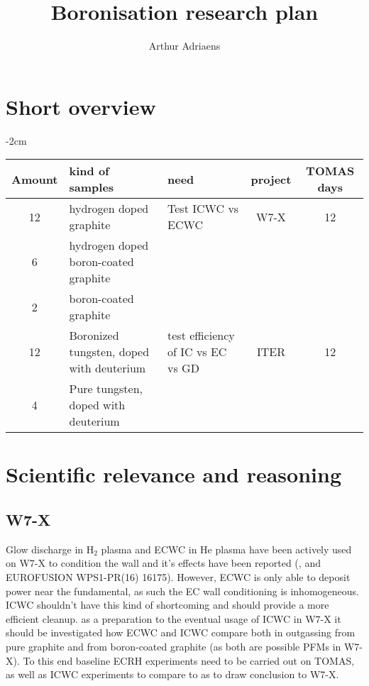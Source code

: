 \documentclass{article}
\title{Boronisation research plan}
\author{Arthur Adriaens}
\begin{document}
\maketitle

\section{Short overview}
\begin{center}
    \addtolength{\leftskip} {-2cm} %
    \addtolength{\rightskip}{-2cm}
    \begin{tabular}{||c p{4cm} p{4cm} c c||}
         \hline
         Amount & kind of samples & need & project & TOMAS days \\ [0.5ex]
         \hline\hline
         12 & hydrogen doped graphite & Test ICWC vs ECWC & W7-X & 12 \\
         6 & hydrogen doped boron-coated graphite & & & \\
         2 & boron-coated graphite & & & \\
         \hline
         12 & Boronized tungsten, doped with deuterium & test efficiency of IC vs EC vs GD & ITER & 12\\
         4 & Pure tungsten, doped with deuterium & & &\\
         \hline
    \end{tabular}
\end{center}
\section{Scientific relevance and reasoning}
\subsection*{W7-X}
Glow discharge in H$_2$ plasma and ECWC in He plasma have been actively used on W7-X 
to condition the wall and it's effects have been reported (\cite{Goriaev_2020},\cite{WAUTERS2018235} and EUROFUSION WPS1-PR(16) 16175).
However, ECWC is only able to deposit power near the fundamental, as such the EC wall conditioning is
inhomogeneous. ICWC shouldn't have this kind of shortcoming and should provide a more efficient cleanup\cite{WEGAIC}. as a preparation to the eventual 
usage of ICWC in W7-X it should be investigated how ECWC and ICWC compare both in outgassing from
pure graphite and from boron-coated graphite (as both are possible PFMs in W7-X).
To this end baseline ECRH experiments need to be carried out on TOMAS, as well as ICWC experiments
to compare to as to draw conclusion to W7-X.
\end{document}
